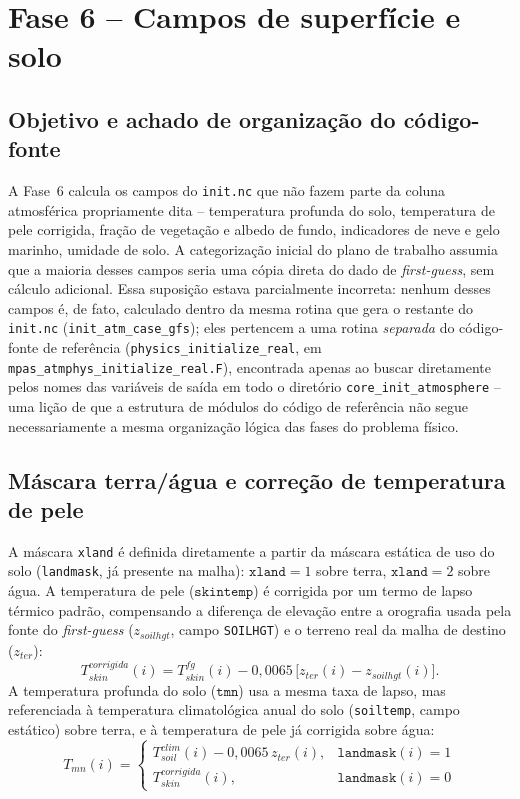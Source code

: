 \chapter{Fase 6 -- Campos de superfície e solo}
\label{cap:fase6}

\section{Objetivo e achado de organização do código-fonte}

A Fase~6 calcula os campos do \texttt{init.nc} que não fazem parte da
coluna atmosférica propriamente dita -- temperatura profunda do solo,
temperatura de pele corrigida, fração de vegetação e albedo de fundo,
indicadores de neve e gelo marinho, umidade de solo. A categorização
inicial do plano de trabalho assumia que a maioria desses campos seria
uma cópia direta do dado de \textit{first-guess}, sem cálculo adicional.
Essa suposição estava parcialmente incorreta: nenhum desses campos é, de
fato, calculado dentro da mesma rotina que gera o restante do
\texttt{init.nc} (\texttt{init\_atm\_case\_gfs}); eles pertencem a uma
rotina \emph{separada} do código-fonte de referência
(\texttt{physics\_initialize\_real}, em
\texttt{mpas\_atmphys\_initialize\_real.F}), encontrada apenas ao buscar
diretamente pelos nomes das variáveis de saída em todo o diretório
\texttt{core\_init\_atmosphere} -- uma lição de que a estrutura de módulos
do código de referência não segue necessariamente a mesma organização
lógica das fases do problema físico.

\section{Máscara terra/água e correção de temperatura de pele}

A máscara \texttt{xland} é definida diretamente a partir da máscara
estática de uso do solo (\texttt{landmask}, já presente na malha):
$\texttt{xland}=1$ sobre terra, $\texttt{xland}=2$ sobre água. A
temperatura de pele ($\texttt{skintemp}$) é corrigida por um termo de
lapso térmico padrão, compensando a diferença de elevação entre a
orografia usada pela fonte do \textit{first-guess}
($z_{soilhgt}$, campo \texttt{SOILHGT}) e o terreno real da malha de
destino ($z_{ter}$):
\begin{equation}
  T_{skin}^{corrigida}(i) = T_{skin}^{fg}(i) - 0{,}0065\,\big[z_{ter}(i) - z_{soilhgt}(i)\big].
  \label{eq:skintemp}
\end{equation}
A temperatura profunda do solo ($\texttt{tmn}$) usa a mesma taxa de
lapso, mas referenciada à temperatura climatológica anual do solo
(\texttt{soiltemp}, campo estático) sobre terra, e à temperatura de pele
já corrigida sobre água:
\begin{equation}
  T_{mn}(i) =
  \begin{cases}
    T_{soil}^{clim}(i) - 0{,}0065\, z_{ter}(i), & \texttt{landmask}(i)=1 \\
    T_{skin}^{corrigida}(i), & \texttt{landmask}(i)=0
  \end{cases}
  \label{eq:tmn}
\end{equation}

